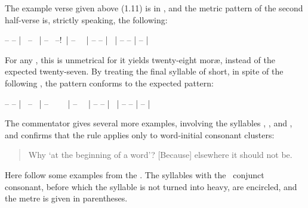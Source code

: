 \noindent
The example verse given above (1.11) is in , and the
metric pattern of the second half-verse is, strictly speaking, the following:
 
-- -- | \shortsyllable\ -- \shortsyllable\ | -- \shortsyllable\ --!~| 
-- \shortsyllable\ \shortsyllable\ | 
-- -- | \shortsyllable\ | --  -- | -- |

\noindent
For any , this is unmetrical for it yields twenty-eight mor\ae, instead
of the expected twenty-seven. By treating the final syllable of  short, 
in spite of the following , the pattern conforms 
to the expected pattern: 

-- -- | \shortsyllable\ -- \shortsyllable\ | 
-- \shortsyllable\ \shortsyllable\ \ \ | -- \shortsyllable\ \shortsyllable\ | -- -- | 
\shortsyllable\ | -- -- | -- |

\noindent
The commentator gives several more examples, involving the syllables
, , and , and confirms that the rule
applies only to word-initial consonant clusters: 

\begin{quote}
{\footnotesize{}

Why `at the beginning of a word'? [Because] elsewhere it should not be.}
\end{quote}

\noindent
Here follow some examples from the \VSS. The syllables 
with the \krama\ conjunct consonant, before which the syllable
is not turned into heavy, are encircled, and the metre is given in 
parentheses.
\vfill\pagebreak

